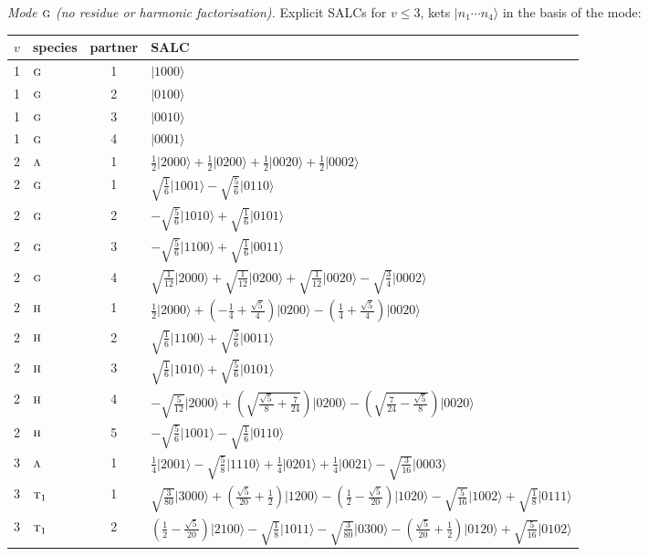 \documentclass[11pt]{article}
\newcommand{\irr}[1]{\text{\normalfont\scshape #1}}
\newcommand{\occ}[1]{\lvert #1\rangle}
\begin{document}
\emph{Mode $\irr{g}$ (no residue or harmonic factorisation).} Explicit SALCs for $v\le3$, kets $\occ{n_1\cdots n_{4}}$ in the basis of the mode:
\begin{longtable}{c l c p{}}\hline $v$ & species & partner & SALC\\ \hline\endhead
1 & $\irr{g}$ & 1 & $\occ{1000}$\\
1 & $\irr{g}$ & 2 & $\occ{0100}$\\
1 & $\irr{g}$ & 3 & $\occ{0010}$\\
1 & $\irr{g}$ & 4 & $\occ{0001}$\\
\hline
2 & $\irr{a}$ & 1 & $\tfrac{1}{2}\occ{2000}+\tfrac{1}{2}\occ{0200}+\tfrac{1}{2}\occ{0020}+\tfrac{1}{2}\occ{0002}$\\
2 & $\irr{g}$ & 1 & $\sqrt{\tfrac{1}{6}}\occ{1001}-\sqrt{\tfrac{5}{6}}\occ{0110}$\\
2 & $\irr{g}$ & 2 & $-\sqrt{\tfrac{5}{6}}\occ{1010}+\sqrt{\tfrac{1}{6}}\occ{0101}$\\
2 & $\irr{g}$ & 3 & $-\sqrt{\tfrac{5}{6}}\occ{1100}+\sqrt{\tfrac{1}{6}}\occ{0011}$\\
2 & $\irr{g}$ & 4 & $\sqrt{\tfrac{1}{12}}\occ{2000}+\sqrt{\tfrac{1}{12}}\occ{0200}+\sqrt{\tfrac{1}{12}}\occ{0020}-\sqrt{\tfrac{3}{4}}\occ{0002}$\\
2 & $\irr{h}$ & 1 & $\tfrac{1}{2}\occ{2000}+(- \frac{1}{4} + \frac{\sqrt{5}}{4})\occ{0200}-(\frac{1}{4} + \frac{\sqrt{5}}{4})\occ{0020}$\\
2 & $\irr{h}$ & 2 & $\sqrt{\tfrac{1}{6}}\occ{1100}+\sqrt{\tfrac{5}{6}}\occ{0011}$\\
2 & $\irr{h}$ & 3 & $\sqrt{\tfrac{1}{6}}\occ{1010}+\sqrt{\tfrac{5}{6}}\occ{0101}$\\
2 & $\irr{h}$ & 4 & $-\sqrt{\tfrac{5}{12}}\occ{2000}+(\sqrt{\frac{\sqrt{5}}{8} + \frac{7}{24}})\occ{0200}-(\sqrt{\frac{7}{24} - \frac{\sqrt{5}}{8}})\occ{0020}$\\
2 & $\irr{h}$ & 5 & $-\sqrt{\tfrac{5}{6}}\occ{1001}-\sqrt{\tfrac{1}{6}}\occ{0110}$\\
\hline
3 & $\irr{a}$ & 1 & $\tfrac{1}{4}\occ{2001}-\sqrt{\tfrac{5}{8}}\occ{1110}+\tfrac{1}{4}\occ{0201}+\tfrac{1}{4}\occ{0021}-\sqrt{\tfrac{3}{16}}\occ{0003}$\\
3 & $\irr{t}_{1}$ & 1 & $\sqrt{\tfrac{3}{80}}\occ{3000}+(\frac{\sqrt{5}}{20} + \frac{1}{2})\occ{1200}-(\frac{1}{2} - \frac{\sqrt{5}}{20})\occ{1020}-\sqrt{\tfrac{5}{16}}\occ{1002}+\sqrt{\tfrac{1}{8}}\occ{0111}$\\
3 & $\irr{t}_{1}$ & 2 & $(\frac{1}{2} - \frac{\sqrt{5}}{20})\occ{2100}-\sqrt{\tfrac{1}{8}}\occ{1011}-\sqrt{\tfrac{3}{80}}\occ{0300}-(\frac{\sqrt{5}}{20} + \frac{1}{2})\occ{0120}+\sqrt{\tfrac{5}{16}}\occ{0102}$\\

\end{longtable}
\end{document}

